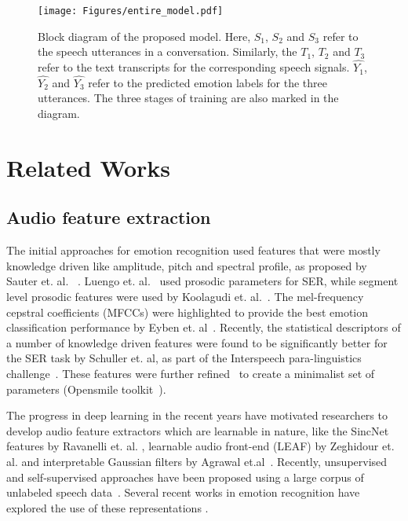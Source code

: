 \documentclass[lettersize,journal]{IEEEtran}
\begin{document}
\begin{figure*}
    \centering
    \texttt{[image: Figures/entire\_model.pdf]}
    \vspace{-0.1in}
    \caption{Block diagram of the proposed model. Here, $S_1$, $S_2$ and $S_3$ refer to the speech utterances in a conversation. Similarly, the $T_1$, $T_2$ and $T_3$ refer to the text transcripts for the corresponding speech signals. $\hat{Y_1}$, $\hat{Y_2}$ and $\hat{Y_3}$ refer to the predicted emotion labels for the three utterances. The three stages of training are also marked in the diagram.}\label{fig:entire model}
    \vspace{-0.1in}

\end{figure*}

\section{Related Works}\label{relatedworks}
\subsection{Audio feature extraction}
The initial approaches for emotion recognition used features that were mostly knowledge driven like amplitude, pitch and spectral profile, as proposed by Sauter et. al. ~\cite{sauter2010perceptual}. Luengo et. al.~\cite{luengo2005automatic} used prosodic parameters for SER, while segment level prosodic features were used by Koolagudi et. al.~\cite{koolagudi2011speech}. The mel-frequency cepstral coefficients (MFCCs) were highlighted to provide the best emotion classification performance by Eyben et. al~\cite{eyben2013affect}. Recently, the statistical descriptors of a number of knowledge driven features were found to be significantly better for the SER task by Schuller et. al, as part of the Interspeech para-linguistics challenge~\cite{schuller2013interspeech}. These features were further refined~\cite{eyben2015geneva} to create a minimalist set of parameters (Opensmile toolkit~\cite{eyben2010opensmile}). 

The progress in deep learning in the recent years have motivated researchers to develop audio feature extractors which are learnable in nature, like the SincNet features by Ravanelli et. al. \cite{ravanelli2018speaker}, learnable audio front-end (LEAF) by Zeghidour et. al. \cite{zeghidour2021leaf} and interpretable Gaussian filters by Agrawal et.al~\cite{agrawal2019modulation,agrawal2020interpretable}. Recently, unsupervised and self-supervised approaches have been proposed using a large corpus of unlabeled speech data~\cite{schneider2019wav2vec, baevski2020wav2vec}. 
Several recent works in emotion recognition have explored the use of these representations \cite{siriwardhana2020jointly, macary2021use, pepino2021emotion}.
\end{document}
